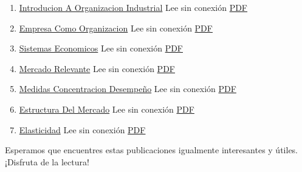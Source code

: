 \documentclass[
  jou,
  floatsintext,
  longtable,
  a4paper,
  nolmodern,
  notxfonts,
  notimes,
  colorlinks=true,linkcolor=blue,citecolor=blue,urlcolor=blue]{apa7}
\providecommand{\tightlist}{%
  \setlength{\itemsep}{0pt}\setlength{\parskip}{0pt}}
\begin{document}
\begin{enumerate}
\def\labelenumi{\arabic{enumi}.}
\tightlist
\item
  \href{https://achalmaedison.netlify.app/microeconomia/organizacion-industrial/2023-06-12-introducion-a-organizacion-industrial}{Introducion
  A Organizacion Industrial} Lee sin conexión
  \href{https://achalmaedison.netlify.app/microeconomia/organizacion-industrial/2023-06-12-introducion-a-organizacion-industrial/index.pdf}{PDF}
\item
  \href{https://achalmaedison.netlify.app/microeconomia/organizacion-industrial/2023-06-13-empresa-como-organizacion}{Empresa
  Como Organizacion} Lee sin conexión
  \href{https://achalmaedison.netlify.app/microeconomia/organizacion-industrial/2023-06-13-empresa-como-organizacion/index.pdf}{PDF}
\item
  \href{https://achalmaedison.netlify.app/microeconomia/organizacion-industrial/2023-06-13-sistemas-economicos}{Sistemas
  Economicos} Lee sin conexión
  \href{https://achalmaedison.netlify.app/microeconomia/organizacion-industrial/2023-06-13-sistemas-economicos/index.pdf}{PDF}
\item
  \href{https://achalmaedison.netlify.app/microeconomia/organizacion-industrial/2023-06-15-mercado-relevante}{Mercado
  Relevante} Lee sin conexión
  \href{https://achalmaedison.netlify.app/microeconomia/organizacion-industrial/2023-06-15-mercado-relevante/index.pdf}{PDF}
\item
  \href{https://achalmaedison.netlify.app/microeconomia/organizacion-industrial/2023-06-16-medidas-concentracion-desempeño}{Medidas
  Concentracion Desempeño} Lee sin conexión
  \href{https://achalmaedison.netlify.app/microeconomia/organizacion-industrial/2023-06-16-medidas-concentracion-desempeño/index.pdf}{PDF}
\item
  \href{https://achalmaedison.netlify.app/microeconomia/organizacion-industrial/2023-06-17-estructura-del-mercado}{Estructura
  Del Mercado} Lee sin conexión
  \href{https://achalmaedison.netlify.app/microeconomia/organizacion-industrial/2023-06-17-estructura-del-mercado/index.pdf}{PDF}
\item
  \href{https://achalmaedison.netlify.app/microeconomia/organizacion-industrial/2023-06-23-elasticidad}{Elasticidad}
  Lee sin conexión
  \href{https://achalmaedison.netlify.app/microeconomia/organizacion-industrial/2023-06-23-elasticidad/index.pdf}{PDF}
\end{enumerate}

Esperamos que encuentres estas publicaciones igualmente interesantes y
útiles. ¡Disfruta de la lectura!
\end{document}

